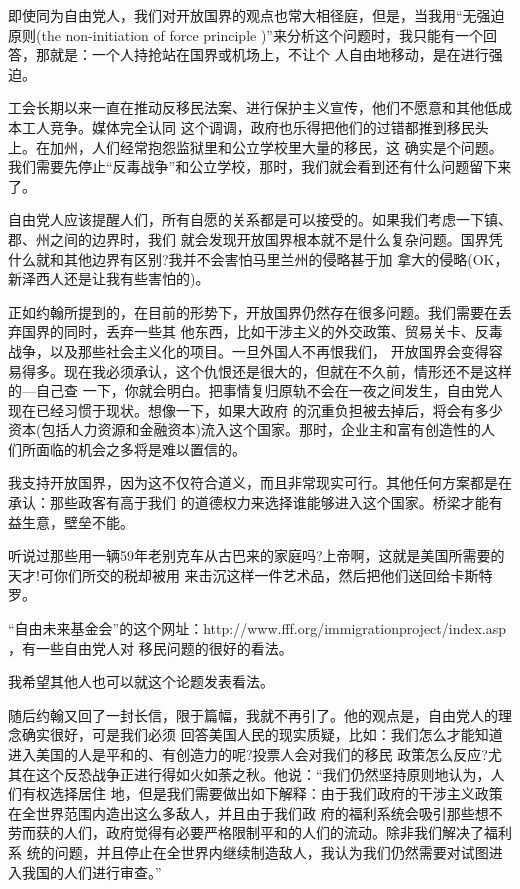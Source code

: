 ﻿\documentclass[11pt]{article}
\begin{document}
即使同为自由党人，我们对开放国界的观点也常大相径庭，但是，当我用``无强迫原则(the non-initiation
of force principle )''来分析这个问题时，我只能有一个回答，那就是：一个人持抢站在国界或机场上，不让个
人自由地移动，是在进行强迫。

工会长期以来一直在推动反移民法案、进行保护主义宣传，他们不愿意和其他低成本工人竞争。媒体完全认同
这个调调，政府也乐得把他们的过错都推到移民头上。在加州，人们经常抱怨监狱里和公立学校里大量的移民，这
确实是个问题。我们需要先停止``反毒战争''和公立学校，那时，我们就会看到还有什么问题留下来了。

自由党人应该提醒人们，所有自愿的关系都是可以接受的。如果我们考虑一下镇、郡、州之间的边界时，我们
就会发现开放国界根本就不是什么复杂问题。国界凭什么就和其他边界有区别?我并不会害怕马里兰州的侵略甚于加
拿大的侵略(OK，新泽西人还是让我有些害怕的)。

正如约翰所提到的，在目前的形势下，开放国界仍然存在很多问题。我们需要在丢弃国界的同时，丢弃一些其
他东西，比如干涉主义的外交政策、贸易关卡、反毒战争，以及那些社会主义化的项目。一旦外国人不再恨我们，
开放国界会变得容易得多。现在我必须承认，这个仇恨还是很大的，但就在不久前，情形还不是这样的---自己查
一下，你就会明白。把事情复归原轨不会在一夜之间发生，自由党人现在已经习惯于现状。想像一下，如果大政府
的沉重负担被去掉后，将会有多少资本(包括人力资源和金融资本)流入这个国家。那时，企业主和富有创造性的人
们所面临的机会之多将是难以置信的。

我支持开放国界，因为这不仅符合道义，而且非常现实可行。其他任何方案都是在承认：那些政客有高于我们
的道德权力来选择谁能够进入这个国家。桥梁才能有益生意，壁垒不能。

听说过那些用一辆59年老别克车从古巴来的家庭吗?上帝啊，这就是美国所需要的天才!可你们所交的税却被用
来击沉这样一件艺术品，然后把他们送回给卡斯特罗。

``自由未来基金会''的这个网址：http://www.fff.org/immigrationproject/index.asp ，有一些自由党人对
移民问题的很好的看法。

我希望其他人也可以就这个论题发表看法。

随后约翰又回了一封长信，限于篇幅，我就不再引了。他的观点是，自由党人的理念确实很好，可是我们必须
回答美国人民的现实质疑，比如：我们怎么才能知道进入美国的人是平和的、有创造力的呢?投票人会对我们的移民
政策怎么反应?尤其在这个反恐战争正进行得如火如荼之秋。他说：``我们仍然坚持原则地认为，人们有权选择居住
地，但是我们需要做出如下解释：由于我们政府的干涉主义政策在全世界范围内造出这么多敌人，并且由于我们政
府的福利系统会吸引那些想不劳而获的人们，政府觉得有必要严格限制平和的人们的流动。除非我们解决了福利系
统的问题，并且停止在全世界内继续制造敌人，我认为我们仍然需要对试图进入我国的人们进行审查。''
\end{document}
